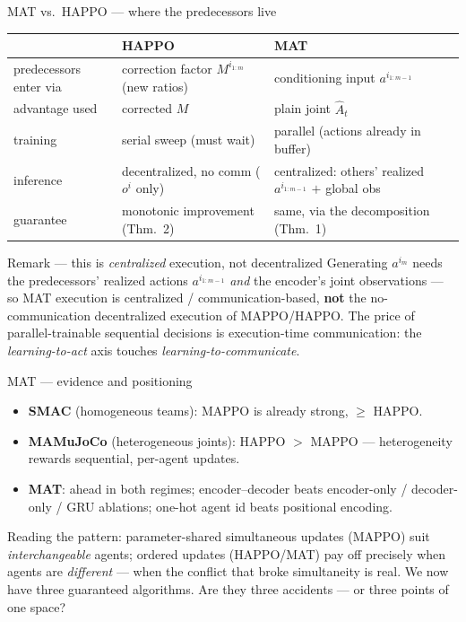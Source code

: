 \documentclass[10pt, aspectratio=169]{beamer}
\begin{document}
\begin{frame}{MAT vs.\ HAPPO --- where the predecessors live}
\begin{center}\footnotesize\renewcommand{\arraystretch}{1.5}
\begin{tabular}{l|l|l}
 & \textbf{HAPPO} & \textbf{MAT} \\
\hline
predecessors enter via & correction factor $M^{i_{1:m}}$ (new ratios) & \alert{conditioning input} $a^{i_{1:m-1}}$ \\
advantage used & corrected $M$ & plain joint $\hat A_t$ \\
training & serial sweep (must wait) & \alert{parallel} (actions already in buffer) \\
inference & \alert{decentralized}, no comm ($o^i$ only) & centralized: others' \alert{realized} $a^{i_{1:m-1}}$ $+$ global obs \\
guarantee & monotonic improvement (Thm.\ 2) & same, via the decomposition (Thm.\ 1) \\
\end{tabular}
\end{center}
\medskip

\pause
\begin{block}{Remark --- this is \emph{centralized} execution, not decentralized}
Generating $a^{i_m}$ needs the predecessors' \alert{realized} actions $a^{i_{1:m-1}}$ \emph{and} the encoder's joint observations --- so MAT execution is \alert{centralized / communication-based}, \textbf{not} the no-communication decentralized execution of MAPPO/HAPPO. The price of parallel-trainable sequential decisions is execution-time communication: the \emph{learning-to-act} axis touches \emph{learning-to-communicate}.
\end{block}
\end{frame}

\begin{frame}{MAT --- evidence and positioning}
\begin{itemize}\setlength\itemsep{3pt}
\item \textbf{SMAC} (homogeneous teams): MAPPO is already strong, $\ge$ HAPPO.
\item \textbf{MAMuJoCo} (heterogeneous joints): HAPPO $>$ MAPPO --- heterogeneity rewards sequential, per-agent updates.
\item \textbf{MAT}: ahead in \alert{both} regimes; encoder--decoder beats encoder-only / decoder-only / GRU ablations; one-hot agent id beats positional encoding.
\end{itemize}
\medskip

\pause
Reading the pattern: parameter-shared simultaneous updates (MAPPO) suit \emph{interchangeable} agents; ordered updates (HAPPO/MAT) pay off precisely when agents are \emph{different} --- when the conflict that broke simultaneity is real.
\medskip
\pause
We now have three guaranteed algorithms. Are they three accidents --- or three points of one space?
\end{frame}
\end{document}
